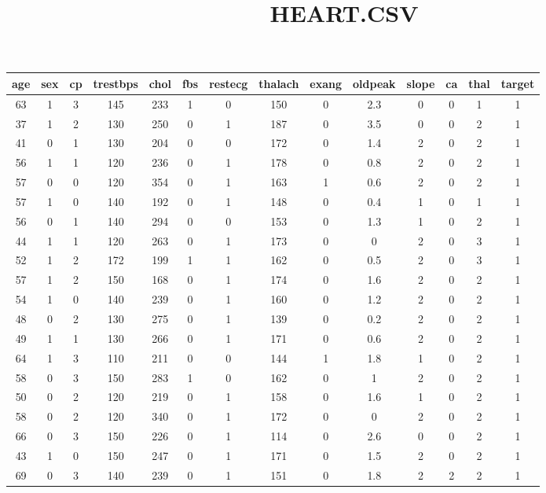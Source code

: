 \documentclass{article}
\title{HEART.CSV}
\date{}
\begin{document}
\maketitle
\begin{longtable}{|c|c|c|c|c|c|c|c|c|c|c|c|c|c|} 
age & sex & cp & trestbps & chol & fbs & restecg & thalach & exang & oldpeak & slope & ca & thal & target\\ \hline
63 & 1 & 3 & 145 & 233 & 1 & 0 & 150 & 0 & 2.3 & 0 & 0 & 1 & 1\\ \hline
37 & 1 & 2 & 130 & 250 & 0 & 1 & 187 & 0 & 3.5 & 0 & 0 & 2 & 1\\ \hline
41 & 0 & 1 & 130 & 204 & 0 & 0 & 172 & 0 & 1.4 & 2 & 0 & 2 & 1\\ \hline
56 & 1 & 1 & 120 & 236 & 0 & 1 & 178 & 0 & 0.8 & 2 & 0 & 2 & 1\\ \hline
57 & 0 & 0 & 120 & 354 & 0 & 1 & 163 & 1 & 0.6 & 2 & 0 & 2 & 1\\ \hline
57 & 1 & 0 & 140 & 192 & 0 & 1 & 148 & 0 & 0.4 & 1 & 0 & 1 & 1\\ \hline
56 & 0 & 1 & 140 & 294 & 0 & 0 & 153 & 0 & 1.3 & 1 & 0 & 2 & 1\\ \hline
44 & 1 & 1 & 120 & 263 & 0 & 1 & 173 & 0 & 0 & 2 & 0 & 3 & 1\\ \hline
52 & 1 & 2 & 172 & 199 & 1 & 1 & 162 & 0 & 0.5 & 2 & 0 & 3 & 1\\ \hline
57 & 1 & 2 & 150 & 168 & 0 & 1 & 174 & 0 & 1.6 & 2 & 0 & 2 & 1\\ \hline
54 & 1 & 0 & 140 & 239 & 0 & 1 & 160 & 0 & 1.2 & 2 & 0 & 2 & 1\\ \hline
48 & 0 & 2 & 130 & 275 & 0 & 1 & 139 & 0 & 0.2 & 2 & 0 & 2 & 1\\ \hline
49 & 1 & 1 & 130 & 266 & 0 & 1 & 171 & 0 & 0.6 & 2 & 0 & 2 & 1\\ \hline
64 & 1 & 3 & 110 & 211 & 0 & 0 & 144 & 1 & 1.8 & 1 & 0 & 2 & 1\\ \hline
58 & 0 & 3 & 150 & 283 & 1 & 0 & 162 & 0 & 1 & 2 & 0 & 2 & 1\\ \hline
50 & 0 & 2 & 120 & 219 & 0 & 1 & 158 & 0 & 1.6 & 1 & 0 & 2 & 1\\ \hline
58 & 0 & 2 & 120 & 340 & 0 & 1 & 172 & 0 & 0 & 2 & 0 & 2 & 1\\ \hline
66 & 0 & 3 & 150 & 226 & 0 & 1 & 114 & 0 & 2.6 & 0 & 0 & 2 & 1\\ \hline
43 & 1 & 0 & 150 & 247 & 0 & 1 & 171 & 0 & 1.5 & 2 & 0 & 2 & 1\\ \hline
69 & 0 & 3 & 140 & 239 & 0 & 1 & 151 & 0 & 1.8 & 2 & 2 & 2 & 1\\ \hline

\end{longtable}
\end{document}
